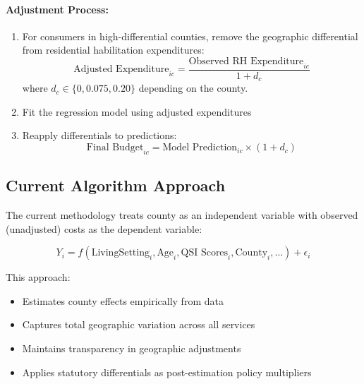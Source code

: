 \paragraph{Adjustment Process:}
\begin{enumerate}
    \item For consumers in high-differential counties, remove the geographic differential from residential habilitation expenditures:
    \begin{equation}
    \text{Adjusted Expenditure}_{ic} = \frac{\text{Observed RH Expenditure}_{ic}}{1 + d_c}
    \label{eq:2010-adjustment}
    \end{equation}
    where $d_c \in \{0, 0.075, 0.20\}$ depending on the county.
    
    \item Fit the regression model using adjusted expenditures
    
    \item Reapply differentials to predictions:
    \begin{equation}
    \text{Final Budget}_{ic} = \text{Model Prediction}_{ic} \times (1 + d_c)
    \label{eq:2010-reapplication}
    \end{equation}
\end{enumerate}

\subsection{Current Algorithm Approach}

The current methodology treats county as an independent variable with observed (unadjusted) costs as the dependent variable:

\begin{equation}
Y_i = f(\text{LivingSetting}_i, \text{Age}_i, \text{QSI Scores}_i, \text{County}_i, \ldots) + \epsilon_i
\label{eq:current-model}
\end{equation}

This approach:
\begin{itemize}
    \item Estimates county effects empirically from data
    \item Captures total geographic variation across all services
    \item Maintains transparency in geographic adjustments
    \item Applies statutory differentials as post-estimation policy multipliers
\end{itemize}

